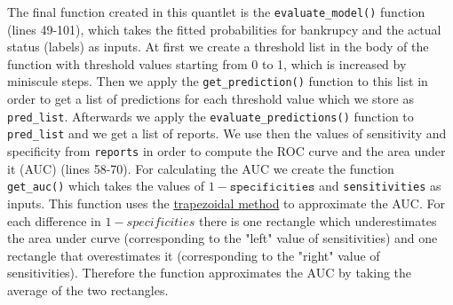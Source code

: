\documentclass{article}
\begin{document}


The final function created in this quantlet is the \texttt{evaluate\_model()} function (lines 49-101), which takes the fitted probabilities for bankrupcy and the actual status (labels) as inputs. At first we create a threshold list in the body of the function with threshold values starting from 0 to 1, which is increased by miniscule steps. Then we apply the \texttt{get\_prediction()} function to this list in order to get a list of predictions for each threshold value which we store as \texttt{pred\_list}. Afterwards we apply the \texttt{evaluate\_predictions()} function to \texttt{pred\_list} and we get a list of reports. We use then the values of sensitivity and specificity from \texttt{reports} in order to compute the ROC curve and the area under it (AUC) (lines 58-70). For calculating the AUC we create the function \texttt{get\_auc()} which takes the values of $1-\texttt{specificities}$ and \texttt{sensitivities} as inputs. This function uses the \href{https://stackoverflow.com/questions/4954507/calculate-the-area-under-a-curve}{trapezoidal method} to approximate the AUC. For each difference in $1-specificities$ there is one rectangle which underestimates the area under curve (corresponding to the "left" value of sensitivities) and one rectangle that overestimates it (corresponding to the "right" value of sensitivities). Therefore the function approximates the AUC by taking the average of the two rectangles. 


\end{document}
